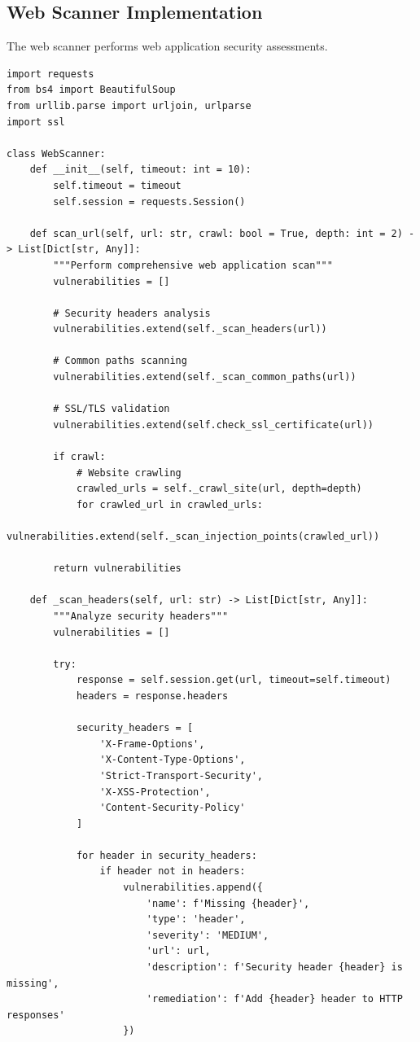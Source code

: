 \documentclass[12pt,a4paper]{report}
\begin{document}
\subsection{Web Scanner Implementation}

The web scanner performs web application security assessments.

\begin{lstlisting}[caption=Web Scanner Implementation]
import requests
from bs4 import BeautifulSoup
from urllib.parse import urljoin, urlparse
import ssl

class WebScanner:
    def __init__(self, timeout: int = 10):
        self.timeout = timeout
        self.session = requests.Session()
        
    def scan_url(self, url: str, crawl: bool = True, depth: int = 2) -> List[Dict[str, Any]]:
        """Perform comprehensive web application scan"""
        vulnerabilities = []
        
        # Security headers analysis
        vulnerabilities.extend(self._scan_headers(url))
        
        # Common paths scanning
        vulnerabilities.extend(self._scan_common_paths(url))
        
        # SSL/TLS validation
        vulnerabilities.extend(self.check_ssl_certificate(url))
        
        if crawl:
            # Website crawling
            crawled_urls = self._crawl_site(url, depth=depth)
            for crawled_url in crawled_urls:
                vulnerabilities.extend(self._scan_injection_points(crawled_url))
        
        return vulnerabilities
    
    def _scan_headers(self, url: str) -> List[Dict[str, Any]]:
        """Analyze security headers"""
        vulnerabilities = []
        
        try:
            response = self.session.get(url, timeout=self.timeout)
            headers = response.headers
            
            security_headers = [
                'X-Frame-Options',
                'X-Content-Type-Options', 
                'Strict-Transport-Security',
                'X-XSS-Protection',
                'Content-Security-Policy'
            ]
            
            for header in security_headers:
                if header not in headers:
                    vulnerabilities.append({
                        'name': f'Missing {header}',
                        'type': 'header',
                        'severity': 'MEDIUM',
                        'url': url,
                        'description': f'Security header {header} is missing',
                        'remediation': f'Add {header} header to HTTP responses'
                    })
                    

\end{lstlisting}
\end{document}
